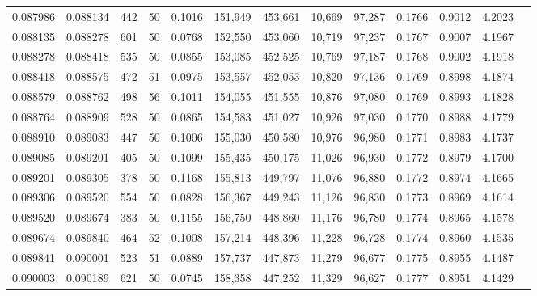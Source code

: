 \begin{tabular}{rrrrrrrrrrrrr}
0.087986 & 0.088134 &   442 &  50 &                                     0.1016 & 151,949 & 453,661 &  10,669 &  97,287 & 0.1766 & 0.9012 & 4.2023 \\
0.088135 & 0.088278 &   601 &  50 &                                     0.0768 & 152,550 & 453,060 &  10,719 &  97,237 & 0.1767 & 0.9007 & 4.1967 \\
0.088278 & 0.088418 &   535 &  50 &                                     0.0855 & 153,085 & 452,525 &  10,769 &  97,187 & 0.1768 & 0.9002 & 4.1918 \\
0.088418 & 0.088575 &   472 &  51 &                                     0.0975 & 153,557 & 452,053 &  10,820 &  97,136 & 0.1769 & 0.8998 & 4.1874 \\
0.088579 & 0.088762 &   498 &  56 &                                     0.1011 & 154,055 & 451,555 &  10,876 &  97,080 & 0.1769 & 0.8993 & 4.1828 \\
0.088764 & 0.088909 &   528 &  50 &                                     0.0865 & 154,583 & 451,027 &  10,926 &  97,030 & 0.1770 & 0.8988 & 4.1779 \\
0.088910 & 0.089083 &   447 &  50 &                                     0.1006 & 155,030 & 450,580 &  10,976 &  96,980 & 0.1771 & 0.8983 & 4.1737 \\
0.089085 & 0.089201 &   405 &  50 &                                     0.1099 & 155,435 & 450,175 &  11,026 &  96,930 & 0.1772 & 0.8979 & 4.1700 \\
0.089201 & 0.089305 &   378 &  50 &                                     0.1168 & 155,813 & 449,797 &  11,076 &  96,880 & 0.1772 & 0.8974 & 4.1665 \\
0.089306 & 0.089520 &   554 &  50 &                                     0.0828 & 156,367 & 449,243 &  11,126 &  96,830 & 0.1773 & 0.8969 & 4.1614 \\
0.089520 & 0.089674 &   383 &  50 &                                     0.1155 & 156,750 & 448,860 &  11,176 &  96,780 & 0.1774 & 0.8965 & 4.1578 \\
0.089674 & 0.089840 &   464 &  52 &                                     0.1008 & 157,214 & 448,396 &  11,228 &  96,728 & 0.1774 & 0.8960 & 4.1535 \\
0.089841 & 0.090001 &   523 &  51 &                                     0.0889 & 157,737 & 447,873 &  11,279 &  96,677 & 0.1775 & 0.8955 & 4.1487 \\
0.090003 & 0.090189 &   621 &  50 &                                     0.0745 & 158,358 & 447,252 &  11,329 &  96,627 & 0.1777 & 0.8951 & 4.1429 \\

\end{tabular}
